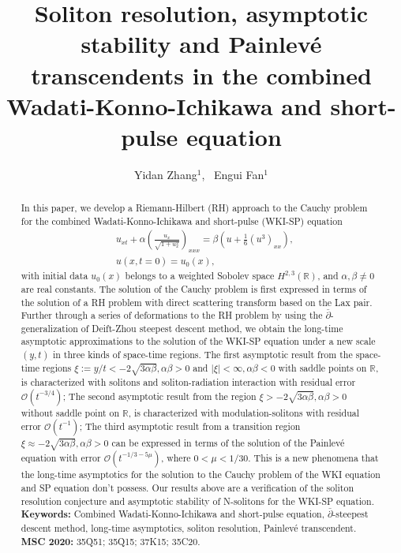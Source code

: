 \documentclass[11pt]{article}
\numberwithin{equation}{section}
\begin{document}
\baselineskip=15pt

	\title{\Large  Soliton resolution, asymptotic stability  and Painlev\'e transcendents in     the combined  Wadati-Konno-Ichikawa and short-pulse equation }
	\author{\Large Yidan Zhang$^1$,  \  Engui Fan$^{1}$}
	\date{ }
	\maketitle

    	\begin{abstract}
		\baselineskip=16pt
In this paper,  we develop   a Riemann-Hilbert (RH)  approach to the Cauchy problem for the combined  Wadati-Konno-Ichikawa and short-pulse (WKI-SP) equation
\begin{align}
    &u_{xt}+\alpha\left(\frac{u_x}{\sqrt{1+u_x^2}}\right)_{xxx}=\beta\left(u+\frac{1}{6}(u^3)_{xx}\right),\nonumber\\
    &u(x,t=0)=u_0(x),\nonumber
\end{align}
with initial data $u_0(x)$ belongs to a weighted Sobolev space $ H^{2,3}(\mathbb{R})$, and $\alpha, \beta \not=0$ are real constants. The solution of the Cauchy problem is first  expressed in terms of the solution of a RH problem with direct scattering transform based on the Lax pair.
Further through  a series of deformations to the  RH  problem by using the $\bar{\partial}$-generalization of Deift-Zhou steepest descent method, we obtain  the long-time asymptotic approximations to the solution   of the WKI-SP equation under a new scale $(y,t)$ in three kinds of  space-time regions. The first asymptotic  result from  the  space-time  regions   $ \xi:=y/t <-2\sqrt{3\alpha\beta}, \alpha\beta>0$ and $|\xi|<\infty,\alpha\beta<0$ with saddle points on $\mathbb{R}$, is characterized with  solitons and soliton-radiation interaction with residual error $\mathcal{O}(t^{-3/4})$;
The second asymptotic  result from   the region    $ \xi >-2\sqrt{3\alpha\beta}, \alpha\beta>0$ without saddle point on $\mathbb{R}$,  is characterized with modulation-solitons with residual error $\mathcal{O}(t^{-1})$;    The third  asymptotic  result  from  a  transition  region   $\xi \approx -2\sqrt{3\alpha\beta},\alpha\beta>0$  can be expressed in terms of the  solution of the  Painlev\'{e} \uppercase\expandafter{} equation with error $\mathcal{O}(t^{-1/3-5\mu})$, where $0<\mu<1/30$. This is a new phenomena that the long-time asymptotics for the solution to the  Cauchy problem of the WKI equation and SP equation don't possess.  Our   results above  are  a verification of  the soliton resolution conjecture and asymptotic stability of N-solitons for the WKI-SP equation.
\\[6pt]
 {\bf Keywords:}  Combined Wadati-Konno-Ichikawa and short-pulse equation,       $\bar\partial$-steepest descent method, long-time asymptotics, soliton resolution,
 Painlev\'e transcendent.\\[6pt]
 {\bf MSC 2020:} 35Q51; 35Q15; 37K15; 35C20.
    \end{abstract}
\end{document}
